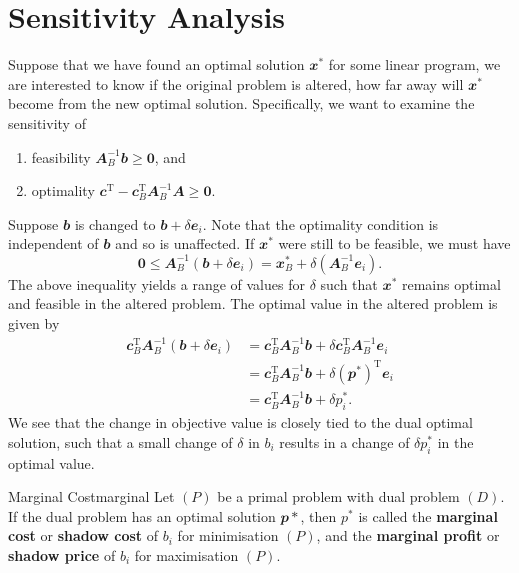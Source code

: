 \documentclass[math, code]{amznotes}
\theoremstyle{remark}
\begin{document}
\section{Sensitivity Analysis}
Suppose that we have found an optimal solution $\mathbfit{x}^*$ for some linear program, we are interested to know if the original problem is altered, how far away will $\mathbfit{x}^*$ become from the new optimal solution. Specifically, we want to examine the sensitivity of 
\begin{enumerate}
    \item feasibility $\mathbfit{A}_B^{-1}\mathbfit{b} \geq \mathbf{0}$, and 
    \item optimality $\mathbfit{c}^{\mathrm{T}} - \mathbfit{c}_B^{\mathrm{T}}\mathbfit{A}_B^{-1}\mathbfit{A} \geq \mathbf{0}$.
\end{enumerate}
Suppose $\mathbfit{b}$ is changed to $\mathbfit{b} + \delta\mathbfit{e}_i$. Note that the optimality condition is independent of $\mathbfit{b}$ and so is unaffected. If $\mathbfit{x}^*$ were still to be feasible, we must have 
\begin{equation*}
    \mathbf{0} \leq \mathbfit{A}_B^{-1}(\mathbfit{b} + \delta\mathbfit{e}_i) = \mathbfit{x}_B^* + \delta\left(\mathbfit{A}_B^{-1}\mathbfit{e}_i\right).
\end{equation*}
The above inequality yields a range of values for $\delta$ such that $\mathbfit{x}^*$ remains optimal and feasible in the altered problem. The optimal value in the altered problem is given by 
\begin{align*}
    \mathbfit{c}^{\mathrm{T}}_B\mathbfit{A}_B^{-1}\left(\mathbfit{b} + \delta\mathbfit{e}_i\right) & = \mathbfit{c}^{\mathrm{T}}_B\mathbfit{A}_B^{-1}\mathbfit{b} + \delta\mathbfit{c}^{\mathrm{T}}_B\mathbfit{A}_B^{-1}\mathbfit{e}_i \\
    & = \mathbfit{c}^{\mathrm{T}}_B\mathbfit{A}_B^{-1}\mathbfit{b} + \delta\left(\mathbfit{p}^*\right)^{\mathrm{T}}\mathbfit{e}_i \\
    & = \mathbfit{c}^{\mathrm{T}}_B\mathbfit{A}_B^{-1}\mathbfit{b} + \delta p^*_i.
\end{align*}
We see that the change in objective value is closely tied to the dual optimal solution, such that a small change of $\delta$ in $b_i$ results in a change of $\delta p^*_i$ in the optimal value.
\begin{dfnbox}{Marginal Cost}{marginal}
    Let $(P)$ be a primal problem with dual problem $(D)$. If the dual problem has an optimal solution $\mathbfit{p}*$, then $p^*$ is called the {\color{red} \textbf{marginal cost}} or {\color{red} \textbf{shadow cost}} of $b_i$ for minimisation $(P)$, and the {\color{red} \textbf{marginal profit}} or {\color{red} \textbf{shadow price}} of $b_i$ for maximisation $(P)$.
\end{dfnbox}
\end{document}
